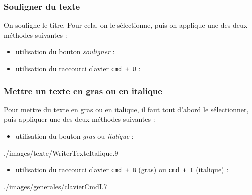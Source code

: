 \subsubsection{Souligner du texte}

On souligne le titre. Pour cela, on le sélectionne, puis on applique une des deux méthodes suivantes :

\begin{itemize}
\item utilisation du bouton \emph{souligner} :  
\item utilisation du raccourci clavier \texttt{cmd + U} : 
\end{itemize}




\subsubsection{Mettre un texte en gras ou en italique}

Pour mettre du texte en gras ou en italique, il faut tout d'abord le sélectionner, puis appliquer une des deux méthodes suivantes :

\begin{itemize}
\item utilisation du bouton \emph{gras} ou \emph{italique} :
\end{itemize}
%
              {./images/texte/WriterTexteItalique}{.9\textwidth}
\begin{itemize}
\item utilisation du raccourci clavier \texttt{cmd + B} (gras) ou \texttt{cmd + I} (italique) :
\end{itemize}
%
              {./images/generales/clavierCmdI}{.7\textwidth}


    










